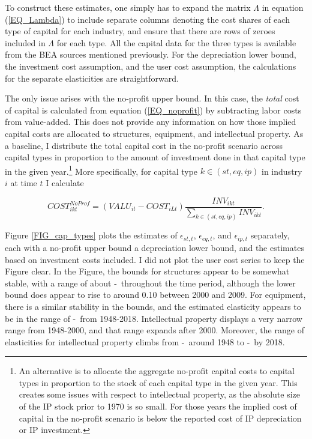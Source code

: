 \documentclass[11pt]{article}
\begin{document}
To construct these estimates, one simply has to expand the matrix $\Lambda$ in equation (\ref{EQ_Lambda}) to include separate columns denoting the cost shares of each type of capital for each industry, and ensure that there are rows of zeroes included in $\Lambda$ for each type. All the capital data for the three types is available from the BEA sources mentioned previously. For the depreciation lower bound, the investment cost assumption, and the user cost assumption, the calculations for the separate elasticities are straightforward. 

The only issue arises with the no-profit upper bound. In this case, the \textit{total} cost of capital is calculated from equation (\ref{EQ_noprofit}) by subtracting labor costs from value-added. This does not provide any information on how those implied capital costs are allocated to structures, equipment, and intellectual property. As a baseline, I distribute the total capital cost in the no-profit scenario across capital types in proportion to the amount of investment done in that capital type in the given year.\footnote{An alternative is to allocate the aggregate no-profit capital costs to capital types in proportion to the stock of each capital type in the given year. This creates some issues with respect to intellectual property, as the absolute size of the IP stock prior to 1970 is so small. For those years the implied cost of capital in the no-profit scenario is below the reported cost of IP depreciation or IP investment.} More specifically, for capital type $k \in (st,eq,ip)$ in industry $i$ at time $t$ I calculate

\begin{equation}
    COST_{ikt}^{NoProf} = \left(VALU_{it} - COST_{iLt}\right)\frac{INV_{ikt}}{\sum_{k \in (st,eq,ip)} INV_{ikt}}.
\end{equation}

Figure \ref{FIG_cap_types} plots the estimates of $\epsilon_{st,t}$, $\epsilon_{eq,t}$, and $\epsilon_{ip,t}$ separately, each with a no-profit upper bound a depreciation lower bound, and the estimates based on investment costs included. I did not plot the user cost series to keep the Figure clear. In the Figure, the bounds for structures appear to be somewhat stable, with a range of about \basestdepr-\basetnoprofit \ throughout the time period, although the lower bound does appear to rise to around 0.10 between 2000 and 2009. For equipment, there is a similar stability in the bounds, and the estimated elasticity appears to be in the range of \baseeqdepr-\baseeqnoprofit \ from 1948-2018. Intellectual property displays a very narrow range from 1948-2000, and that range expands after 2000. Moreover, the range of elasticities for intellectual property climbs from \baseipearlydepr-\baseipearlynoprofit \ around 1948 to \baseiplatedepr-\baseiplatenoprofit \ by 2018.
\end{document}
